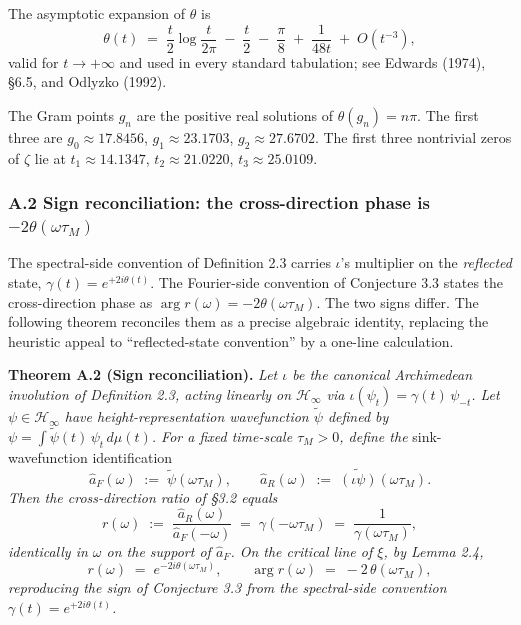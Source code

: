 \documentclass[
  letterpaper,
  11pt]{article}
\theoremstyle{plain}
\theoremstyle{definition}
\theoremstyle{remark}
\begin{document}
The asymptotic expansion of \(\theta\) is
\[\theta(t) \;=\; \frac{t}{2}\log\frac{t}{2\pi} \;-\; \frac{t}{2} \;-\; \frac{\pi}{8} \;+\; \frac{1}{48 t} \;+\; O(t^{-3}),\]
valid for \(t \to +\infty\) and used in every standard tabulation; see Edwards (1974), §6.5, and Odlyzko (1992).

The Gram points \(g_n\) are the positive real solutions of \(\theta(g_n) = n\pi\). The first three are \(g_0 \approx 17.8456\), \(g_1 \approx 23.1703\), \(g_2 \approx 27.6702\). The first three nontrivial zeros of \(\zeta\) lie at \(t_1 \approx 14.1347\), \(t_2 \approx 21.0220\), \(t_3 \approx 25.0109\).

\subsubsection{\texorpdfstring{A.2 Sign reconciliation: the cross-direction phase is \(-2\theta(\omega\tau_M)\)}{A.2 Sign reconciliation: the cross-direction phase is -2\textbackslash theta(\textbackslash omega\textbackslash tau\_M)}}\label{a.2-sign-reconciliation-the-cross-direction-phase-is--2thetaomegatau_m}

The spectral-side convention of Definition 2.3 carries \(\iota\)'s multiplier on the \emph{reflected} state, \(\gamma(t) = e^{+2i\theta(t)}\). The Fourier-side convention of Conjecture 3.3 states the cross-direction phase as \(\arg r(\omega) = -2\theta(\omega\tau_M)\). The two signs differ. The following theorem reconciles them as a precise algebraic identity, replacing the heuristic appeal to ``reflected-state convention'' by a one-line calculation.

\textbf{Theorem A.2 (Sign reconciliation).} \emph{Let \(\iota\) be the canonical Archimedean involution of Definition 2.3, acting linearly on \(\mathcal{H}_\infty\) via \(\iota(\psi_t) = \gamma(t)\,\psi_{-t}\). Let \(\psi \in \mathcal{H}_\infty\) have height-representation wavefunction \(\tilde\psi\) defined by \(\psi = \int \tilde\psi(t)\,\psi_t\,d\mu(t)\). For a fixed time-scale \(\tau_M > 0\), define the} sink-wavefunction identification
\[\hat a_F(\omega) \;:=\; \tilde\psi(\omega\tau_M), \qquad \hat a_R(\omega) \;:=\; \widetilde{(\iota\psi)}(\omega\tau_M).\]
\emph{Then the cross-direction ratio of §3.2 equals}
\[r(\omega) \;:=\; \frac{\hat a_R(\omega)}{\hat a_F(-\omega)} \;=\; \gamma(-\omega\tau_M) \;=\; \frac{1}{\gamma(\omega\tau_M)},\]
\emph{identically in \(\omega\) on the support of \(\hat a_F\). On the critical line of \(\xi\), by Lemma 2.4,}
\[r(\omega) \;=\; e^{-2i\theta(\omega\tau_M)}, \qquad \arg r(\omega) \;=\; -2\,\theta(\omega\tau_M),\]
\emph{reproducing the sign of Conjecture 3.3 from the spectral-side convention \(\gamma(t) = e^{+2i\theta(t)}\).}
\end{document}
